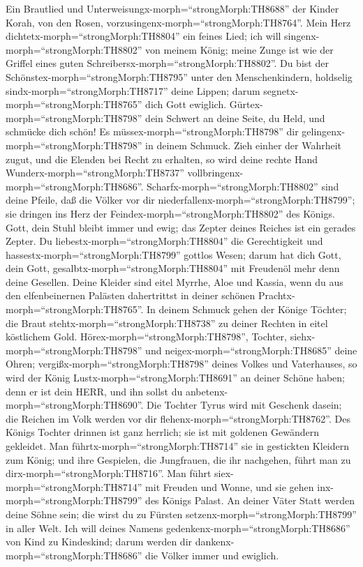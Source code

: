  Ein Brautlied und
Unterweisungx-morph=``strongMorph:TH8688'' der Kinder Korah, von den
Rosen, vorzusingenx-morph=``strongMorph:TH8764''. Mein Herz
dichtetx-morph=``strongMorph:TH8804'' ein feines Lied; ich will
singenx-morph=``strongMorph:TH8802'' von meinem König; meine Zunge ist
wie der Griffel eines guten Schreibersx-morph=``strongMorph:TH8802''.
 Du bist der Schönstex-morph=``strongMorph:TH8795'' unter
den Menschenkindern, holdselig sindx-morph=``strongMorph:TH8717'' deine
Lippen; darum segnetx-morph=``strongMorph:TH8765'' dich Gott ewiglich.
 Gürtex-morph=``strongMorph:TH8798'' dein Schwert an deine
Seite, du Held, und schmücke dich schön!  Es
müssex-morph=``strongMorph:TH8798'' dir
gelingenx-morph=``strongMorph:TH8798'' in deinem Schmuck. Zieh einher
der Wahrheit zugut, und die Elenden bei Recht zu erhalten, so wird deine
rechte Hand Wunderx-morph=``strongMorph:TH8737''
vollbringenx-morph=``strongMorph:TH8686''. 
Scharfx-morph=``strongMorph:TH8802'' sind deine Pfeile, daß die Völker
vor dir niederfallenx-morph=``strongMorph:TH8799''; sie dringen ins Herz
der Feindex-morph=``strongMorph:TH8802'' des Königs.  Gott,
dein Stuhl bleibt immer und ewig; das Zepter deines Reiches ist ein
gerades Zepter.  Du liebestx-morph=``strongMorph:TH8804''
die Gerechtigkeit und hassestx-morph=``strongMorph:TH8799'' gottlos
Wesen; darum hat dich Gott, dein Gott,
gesalbtx-morph=``strongMorph:TH8804'' mit Freudenöl mehr denn deine
Gesellen.  Deine Kleider sind eitel Myrrhe, Aloe und Kassia,
wenn du aus den elfenbeinernen Palästen dahertrittst in deiner schönen
Prachtx-morph=``strongMorph:TH8765''.  In deinem Schmuck
gehen der Könige Töchter; die Braut stehtx-morph=``strongMorph:TH8738''
zu deiner Rechten in eitel köstlichem Gold. 
Hörex-morph=``strongMorph:TH8798'', Tochter,
siehx-morph=``strongMorph:TH8798'' und
neigex-morph=``strongMorph:TH8685'' deine Ohren;
vergißx-morph=``strongMorph:TH8798'' deines Volkes und Vaterhauses,
 so wird der König Lustx-morph=``strongMorph:TH8691'' an
deiner Schöne haben; denn er ist dein HERR, und ihn sollst du
anbetenx-morph=``strongMorph:TH8690''.  Die Tochter Tyrus
wird mit Geschenk dasein; die Reichen im Volk werden vor dir
flehenx-morph=``strongMorph:TH8762''.  Des Königs Tochter
drinnen ist ganz herrlich; sie ist mit goldenen Gewändern gekleidet.
 Man führtx-morph=``strongMorph:TH8714'' sie in gestickten
Kleidern zum König; und ihre Gespielen, die Jungfrauen, die ihr
nachgehen, führt man zu dirx-morph=``strongMorph:TH8716''. 
Man führt siex-morph=``strongMorph:TH8714'' mit Freuden und Wonne, und
sie gehen inx-morph=``strongMorph:TH8799'' des Königs Palast.
 An deiner Väter Statt werden deine Söhne sein; die wirst
du zu Fürsten setzenx-morph=``strongMorph:TH8799'' in aller Welt.
 Ich will deines Namens
gedenkenx-morph=``strongMorph:TH8686'' von Kind zu Kindeskind; darum
werden dir dankenx-morph=``strongMorph:TH8686'' die Völker immer und
ewiglich.

